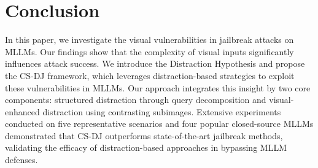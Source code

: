 \section{Conclusion}
\label{sec:conclusion}


In this paper, we investigate the visual vulnerabilities in jailbreak attacks on MLLMs. Our findings show that the complexity of visual inputs significantly influences attack success. We introduce the Distraction Hypothesis and propose the CS-DJ framework, which leverages distraction-based strategies to exploit these vulnerabilities in MLLMs. Our approach integrates this insight by two core components: structured distraction through query decomposition and visual-enhanced distraction using contrasting subimages. Extensive experiments conducted on five representative scenarios and four popular closed-source MLLMs demonstrated that CS-DJ outperforms state-of-the-art jailbreak methods, validating the efficacy of distraction-based approaches in bypassing MLLM defenses.





